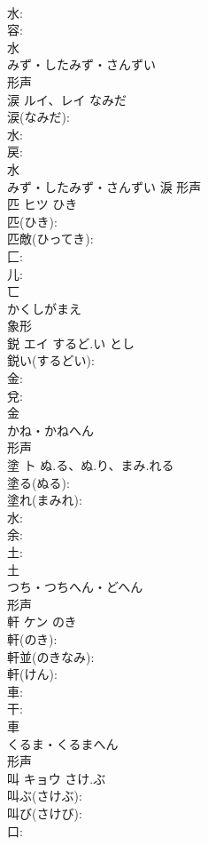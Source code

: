 \documentclass[8pt]{extreport}
\begin{document}
\begin{CJK}{UTF8}{min}
\\	水: 
\\	容: 
\\	水	
\\	みず・したみず・さんずい	
\\	形声 
\\	涙	ルイ、レイ	なみだ		
\\	涙(なみだ): 
\\	水: 
\\	戻: 
\\	水	
\\	みず・したみず・さんずい	淚	形声 
\\	匹	ヒツ	ひき		
\\	匹(ひき): 
\\	匹敵(ひってき): 
\\	匚: 
\\	儿: 
\\	匸	
\\	かくしがまえ	
\\	象形 
\\	鋭	エイ	するど.い	とし	
\\	鋭い(するどい): 
\\	金: 
\\	兌: 
\\	金	
\\	かね・かねへん	
\\	形声 
\\	塗	ト	ぬ.る、ぬ.り、まみ.れる		
\\	塗る(ぬる): 
\\	塗れ(まみれ): 
\\	水: 
\\	余: 
\\	土: 
\\	土	
\\	つち・つちへん・どへん	
\\	形声 
\\	軒	ケン	のき		
\\	軒(のき): 
\\	軒並(のきなみ): 
\\	軒(けん): 
\\	車: 
\\	干: 
\\	車	
\\	くるま・くるまへん	
\\	形声 
\\	叫	キョウ	さけ.ぶ		
\\	叫ぶ(さけぶ): 
\\	叫び(さけび): 
\\	口: 

\end{CJK}
\end{document}
